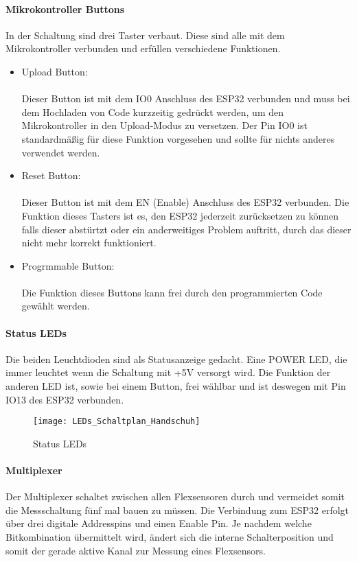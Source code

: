 \documentclass[titlepage,12pt,twoside]{article}
\begin{document}
\paragraph{Mikrokontroller Buttons}
\hfill \break
\hfill \break
In der Schaltung sind drei Taster verbaut. Diese sind alle mit dem Mikrokontroller verbunden und erfüllen verschiedene Funktionen.
\begin{itemize}
	\item Upload Button: \\
		  \\ 
		  Dieser Button ist mit dem IO0 Anschluss des ESP32 verbunden und muss bei dem Hochladen von Code kurzzeitig gedrückt 
		  werden, um den Mikrokontroller in den Upload-Modus zu versetzen. Der Pin IO0 ist standardmäßig für diese Funktion vorgesehen
		  und sollte für nichts anderes verwendet werden. 
	\item Reset Button: \\
		  \\
		  Dieser Button ist mit dem EN (Enable) Anschluss des ESP32 verbunden. Die Funktion dieses Tasters ist es, den ESP32 jederzeit 
		  zurücksetzen zu können falls dieser abstürtzt oder ein anderweitiges Problem auftritt, durch das dieser nicht mehr korrekt
		  funktioniert.
	\item Progrmmable Button: \\
		  \\
		  Die Funktion dieses Buttons kann frei durch den programmierten Code gewählt werden. 
\end{itemize}

\paragraph{Status LEDs}
\hfill \break
\hfill \break
Die beiden Leuchtdioden sind als Statusanzeige gedacht. Eine POWER LED, die immer leuchtet wenn die Schaltung mit +5V
versorgt wird. Die Funktion der anderen LED ist, sowie bei einem Button, frei wählbar und ist deswegen mit Pin IO13 des ESP32
verbunden. \\
\begin{figure}[H]
	\begin{center}
		\scalebox{0.5}
		{\texttt{[image: LEDs\_Schaltplan\_Handschuh]}}
		\caption{Status LEDs}
		\label{fig:LEDs_Schaltplan_Handschuh}		
	\end{center}
\end{figure}

\paragraph{Multiplexer}
\hfill \break
\hfill \break
Der Multiplexer schaltet zwischen allen Flexsensoren durch und vermeidet somit die Messschaltung fünf mal bauen zu müssen. 
Die Verbindung zum ESP32 erfolgt über drei digitale Addresspins und einen Enable Pin. Je nachdem welche Bitkombination übermittelt
wird, ändert sich die interne Schalterposition und somit der gerade aktive Kanal zur Messung eines Flexsensors. \\
\\
\end{document}
